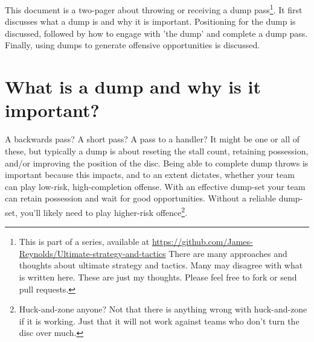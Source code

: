 \documentclass{tufte-handout}
\begin{document}
This document is  
a two-pager about 
throwing or 
receiving a dump pass\footnote{
This
is part of a series, 
available at
\url{https://github.com/James-Reynolds/Ultimate-strategy-and-tactics} 
There are 
many approaches 
and thoughts 
about ultimate 
strategy 
and tactics. 
Many
may disagree 
with what is 
written here. 
These are just 
my thoughts. 
Please feel free to 
fork or send pull requests.}. 
It first discusses 
what a dump is 
and why it is important. 
Positioning for the dump 
is discussed, 
followed by how to 
engage with 'the dump'
and complete a dump pass. 
Finally, using 
dumps to generate 
offensive opportunities 
is discussed. 

\section{What is a dump and why is it important?}\label{sec:what_is_a_dump}
A backwards pass?  
A short pass?  
A pass 
to a handler?
It might be 
one 
or all 
of these, 
but typically 
a dump is about 
reseting the stall count, 
retaining possession, 
and/or improving the position
of the disc.  
Being able 
to complete 
dump throws 
is important because 
this impacts, 
and to an extent dictates, 
whether your team can 
play low-risk, high-completion 
offense. 
With an effective dump-set 
your team can retain possession
and wait for  
good opportunities.  
Without a reliable dump-set, 
you'll likely 
need to play higher-risk 
offence\footnote{
Huck-and-zone anyone? 
Not that there is anything 
wrong with huck-and-zone 
if it is working. 
Just that it 
will not 
work against teams
who don't turn the disc over much.}.  
\end{document}
